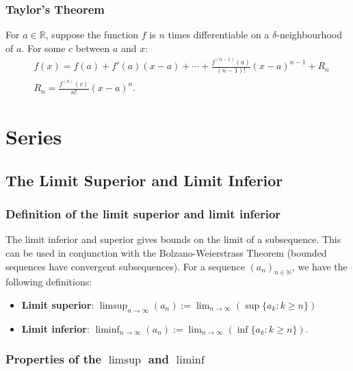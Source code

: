 \documentclass[a4paper, 12pt, twoside]{article}
\begin{document}
\subsubsection{Taylor's Theorem}

For $a \in \mathbb{R}$, suppose the function $f$ is $n$ times differentiable
on a $\delta$-neighbourhood of $a$. For some $c$ between $a$ and $x$:
\begin{align*}
       & f(x) = f(a) + f'(a)(x - a) + \cdots + \frac{f^{(n-1)}(a)}{(n - 1)!}(x-a)^{n-1}
      + R_n                                                                             \\
       & R_n = \frac{f^{(n)}(c)}{n!}(x - a)^n. \tag{Lagrange Form}
\end{align*}

\section{Series}

\subsection{The Limit Superior and Limit Inferior}

\subsubsection{Definition of the limit superior and limit inferior}

The limit inferior and superior gives bounds on the limit of a
subsequence. This can be used in conjunction with the
Bolzano-Weierstrass Theorem (bounded sequences have convergent
subsequences). For a sequence $(a_n)_{n \in \mathbb{N}}$, we
have the following definitions:

\begin{itemize}
      \item \textbf{Limit superior}: $\limsup_{n \to \infty}(a_n)
                  := \lim_{n \to \infty}(\sup\{a_k : k \geq n\})$
      \item \textbf{Limit inferior}: $\liminf_{n \to \infty}(a_n)
                  := \lim_{n \to \infty}(\inf\{a_k : k \geq n\})$.
\end{itemize}

\subsubsection{Properties of the $\limsup$ and $\liminf$}
\end{document}
